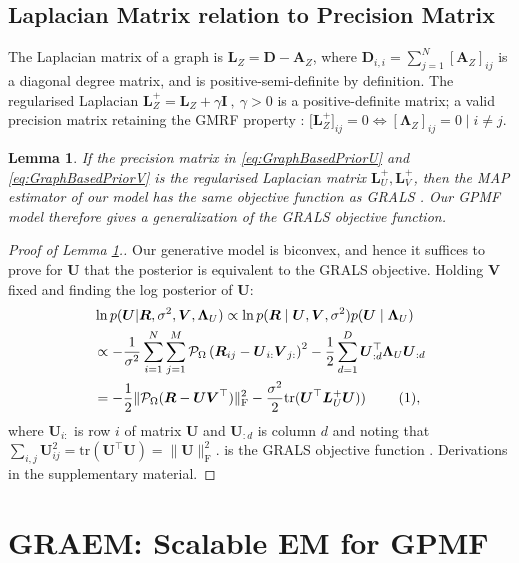 \documentclass{article}
\theoremstyle{plain}
\newtheorem{lem}{Lemma}
\theoremstyle{definition}
\theoremstyle{remark}
\newcommand\numberthis{\addtocounter{equation}{1}\tag{\theequation}}
\def\*#1{\boldsymbol{#1}}
\begin{document}
\subsection{Laplacian Matrix relation to Precision Matrix}  \label{sec:RegLaplaceMat} The Laplacian matrix of a graph is $\*L_Z = \*D - \*A_Z$, where $\*D_{i,i} = \sum_{j=1}^N [\*A_Z]_{ij}$ is a diagonal degree matrix, and is positive-semi-definite by definition.  The regularised Laplacian $\*L_Z^+ = \*L_Z + \gamma \*I \ , \ \gamma > 0$ is a positive-definite matrix; a valid precision matrix retaining the GMRF property \cite{dong2016learning,egilmez2016graph,egilmez2017graph,hastie2009elements,liu2014bayesian}: $\*[\*L_Z^+]_{ij} = 0 \iff [\*\Lambda_Z]_{ij} = 0 \mid i \neq j$.
\begin{lem} \label{lem:PosteriorEquivGRALS}
If the precision matrix in \eqref{eq:GraphBasedPriorU} and  \eqref{eq:GraphBasedPriorV} is the regularised Laplacian matrix $\*L^+_U,\*L^+_V$, then the MAP estimator of our model has the same objective function as GRALS \cite{rao2015collaborative}. Our GPMF model therefore gives a generalization of the GRALS objective function.
\end{lem}
\begin{proof}[Proof of Lemma \ref{lem:PosteriorEquivGRALS}.]
Our generative model is biconvex, and hence it suffices to prove for 
$\*U$ that the posterior is equivalent to the GRALS objective.
Holding $\*V$ fixed and finding the log posterior of $\*U$:
\begin{align*}
&\ln p(\*U | \*R, \sigma^2, \*V, \*\Lambda_U) 
\propto  \ln p(\*R \mid \*U, \*V, \sigma^2) p(\*U \mid \*\Lambda_U)\\
&\propto - \frac{1}{\sigma^2} \sum_{i=1}^{N} \sum_{j=1}^{M} \mathcal{P}_\Omega \left( \*R_{ij} - \*U_{i:} \*V_{j:} \right)^2 - \frac{1}{2} \sum_{d=1}^{D} \*U_{:d}^\top \*\Lambda_U \*U_{:d} \\
&= - \frac{1}{2} \lVert \mathcal{P}_\Omega (\*R - \*U \*V^\top) \rVert_{\text{F}}^2 - \frac{\sigma^2}{2} \text{tr}(\*U^\top \*L^+_U \*U )  ) \ \numberthis \label{eq:MAP_GRALS_Equiv},
\end{align*}
where $\*U_{i:}$ is row $i$ of matrix $\*U$ and $\*U_{:d}$ is column $d$ and noting that $\sum_{i,j} \*U^2_{ij} = \text{tr}(\*U^\top \*U) = \lVert \*U \rVert_{\text{F}}^2$.  is the GRALS objective function \cite{rao2015collaborative}. Derivations in the supplementary material.
\end{proof}

\section{GRAEM: Scalable EM for GPMF} \label{sec:TheEMAlgo}
\end{document}
